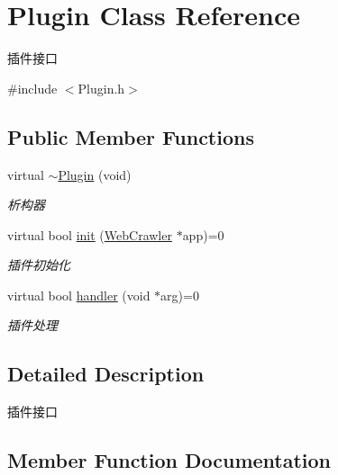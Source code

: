 \hypertarget{class_plugin}{}\section{Plugin Class Reference}
\label{class_plugin}


插件接口  




{\ttfamily \#include $<$Plugin.\+h$>$}

\subsection*{Public Member Functions}
\begin{DoxyCompactItemize}
\item 
\mbox{\label{class_plugin_a14edb40a1a126f4a30496bc5c1724b88}} 
virtual \hyperlink{class_plugin_a14edb40a1a126f4a30496bc5c1724b88}{$\sim$\+Plugin} (void)
\begin{DoxyCompactList}\small\item\em 析构器 \end{DoxyCompactList}\item 
virtual bool \hyperlink{class_plugin_a5473f4276b9992fdaecdd0bc6db60d37}{init} (\hyperlink{class_web_crawler}{Web\+Crawler} $\ast$app)=0
\begin{DoxyCompactList}\small\item\em 插件初始化 \end{DoxyCompactList}\item 
virtual bool \hyperlink{class_plugin_a12c99361b63a4b808b6bbe40d1a5de1d}{handler} (void $\ast$arg)=0
\begin{DoxyCompactList}\small\item\em 插件处理 \end{DoxyCompactList}\end{DoxyCompactItemize}


\subsection{Detailed Description}
插件接口 

\subsection{Member Function Documentation}
\mbox{\label{class_plugin_a12c99361b63a4b808b6bbe40d1a5de1d}} 
